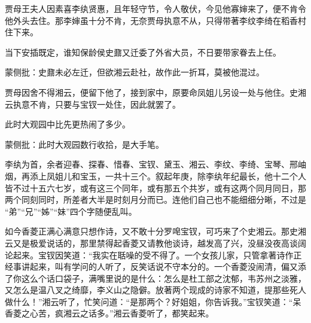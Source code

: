 \begin{parag}
    贾母王夫人因素喜李纨贤惠，且年轻守节，令人敬伏，今见他寡婶来了，便不肯令他外头去住。那李婶虽十分不肯，无奈贾母执意不从，只得带著李纹李绮在稻香村住下来。
\end{parag}


\begin{parag}
    当下安插既定，谁知保龄侯史鼐又迁委了外省大员，不日要带家眷去上任。\begin{note}蒙侧批：史鼐未必左迁，但欲湘云赴社，故作此一折耳，莫被他混过。\end{note}贾母因舍不得湘云，便留下他了，接到家中，原要命凤姐儿另设一处与他住。史湘云执意不肯，只要与宝钗一处住，因此就罢了。
\end{parag}


\begin{parag}
    此时大观园中比先更热闹了多少。\begin{note}蒙侧批：此时大观园数行收拾，是大手笔。\end{note}李纨为首，余者迎春、探春、惜春、宝钗、黛玉、湘云、李纹、李绮、宝琴、邢岫烟，再添上凤姐儿和宝玉，一共十三个。叙起年庚，除李纨年纪最长，他十二个人皆不过十五六七岁，或有这三个同年，或有那五个共岁，或有这两个同月同日，那两个同刻同时，所差者大半是时刻月分而已。连他们自己也不能细细分晰，不过是 “弟”“兄”“姊”“妹”四个字随便乱叫。
\end{parag}


\begin{parag}
    如今香菱正满心满意只想作诗，又不敢十分罗唣宝钗，可巧来了个史湘云。那史湘云又是极爱说话的，那里禁得起香菱又请教他谈诗，越发高了兴，没昼没夜高谈阔论起来。宝钗因笑道：“我实在聒噪的受不得了。一个女孩儿家，只管拿著诗作正经事讲起来，叫有学问的人听了，反笑话说不守本分的。一个香菱没闹清，偏又添了你这么个话口袋子，满嘴里说的是什么：怎么是杜工部之沈郁，韦苏州之淡雅，又怎么是温八叉之绮靡，李义山之隐僻。放著两个现成的诗家不知道，提那些死人做什么！”湘云听了，忙笑问道：“是那两个？好姐姐，你告诉我。”宝钗笑道：“呆香菱之心苦，疯湘云之话多。”湘云香菱听了，都笑起来。
\end{parag}


